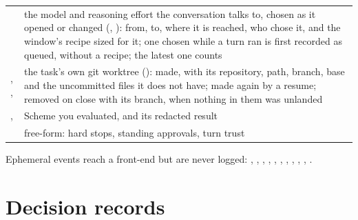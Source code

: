 {\begin{longtable}{@{}L{4.8cm}L{10.2cm}@{}}
 & the model and reasoning effort the conversation talks to, chosen as it opened or changed (, ): from, to, where it is reached, who chose it, and the window's recipe sized for it; one chosen while a turn ran is first recorded as queued, without a recipe; the latest one counts \\
, ,  & the task's own git worktree (): made, with its repository, path, branch, base and the uncommitted files it does not have; made again by a resume; removed on close with its branch, when nothing in them was unlanded \\
,  & Scheme you evaluated, and its redacted result \\
 & free-form: hard stops, standing approvals, turn trust \\
\bottomrule
\end{longtable}}

\begin{sloppypar}
Ephemeral events reach a front-end but are never logged:
, , ,
, , ,
, , , ,
.
\end{sloppypar}

\chapter{Decision records}

